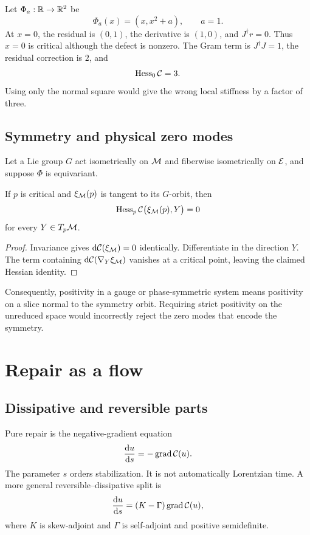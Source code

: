 \documentclass[11pt,a4paper]{article}
\begin{document}
\begin{example}
\label{ex:nonzero-witness}
Let \(\Phi_a:\mathbb{R}\to\mathbb{R}^2\) be
\[
\Phi_a(x)=(x,x^2+a),
\qquad a=1.
\]
At \(x=0\), the residual is \((0,1)\), the derivative is \((1,0)\), and
\(J^{\dagger}r=0\).  Thus \(x=0\) is critical although the defect is
nonzero.  The Gram term is \(J^{\dagger}J=1\), the residual correction is
\(2\), and
\[
\operatorname{Hess}_0\mathcal{C}=3.
\]
Using only the normal square would give the wrong local stiffness by a
factor of three.
\end{example}

\subsection{Symmetry and physical zero modes}

Let a Lie group \(G\) act isometrically on \(\mathcal{M}\) and fiberwise
isometrically on \(\mathcal{E}\), and suppose \(\Phi\) is equivariant.

\begin{proposition}
\label{prop:orbit-zero}
If \(p\) is critical and \(\xi_{\mathcal{M}}(p)\) is tangent to its \(G\)-orbit,
then
\[
\operatorname{Hess}_p\mathcal{C}\bigl(\xi_{\mathcal{M}}(p),Y\bigr)=0
\]
for every \(Y\in T_p\mathcal{M}\).
\end{proposition}

\begin{proof}
Invariance gives \(\mathrm{d}\mathcal{C}(\xi_{\mathcal{M}})=0\) identically.  Differentiate
in the direction \(Y\).  The term containing
\(\mathrm{d}\mathcal{C}(\nabla_Y\xi_{\mathcal{M}})\) vanishes at a critical point, leaving the
claimed Hessian identity.
\end{proof}

Consequently, positivity in a gauge or phase-symmetric system means
positivity on a slice normal to the symmetry orbit.  Requiring strict
positivity on the unreduced space would incorrectly reject the zero modes
that encode the symmetry.

\section{Repair as a flow}
\label{sec:dynamics}

\subsection{Dissipative and reversible parts}

Pure repair is the negative-gradient equation
\begin{equation}
\frac{\mathrm{d} u}{\mathrm{d} s}=-\operatorname{grad}\mathcal{C}(u).
\label{eq:gradient-repair}
\end{equation}
The parameter \(s\) orders stabilization.  It is not automatically
Lorentzian time.  A more general reversible--dissipative split is
\begin{equation}
\frac{\mathrm{d} u}{\mathrm{d} s}=(K-\Gamma)\operatorname{grad}\mathcal{C}(u),
\label{eq:reversible-dissipative}
\end{equation}
where \(K\) is skew-adjoint and \(\Gamma\) is self-adjoint and positive
semidefinite.
\end{document}

